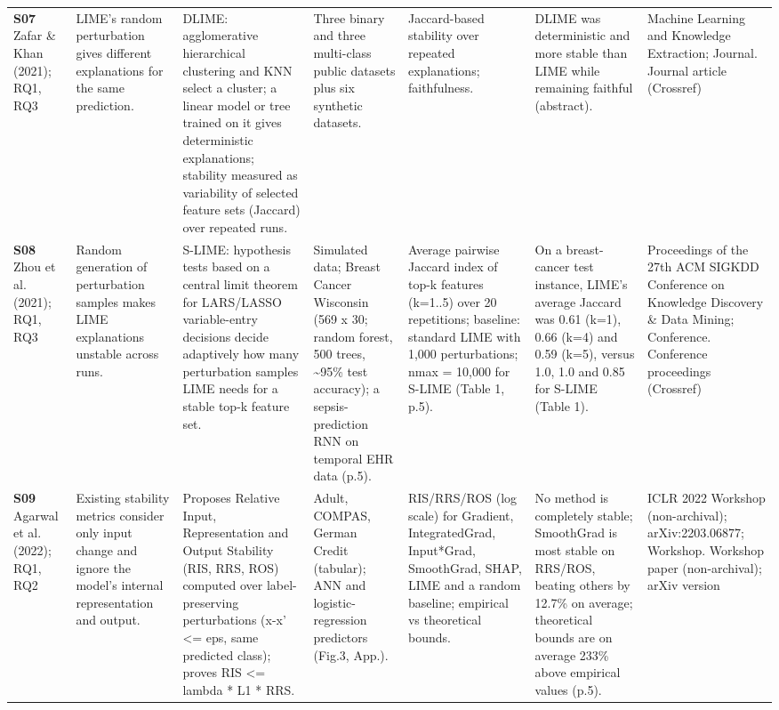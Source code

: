 \begin{longtable}{@{}P{1.55cm}P{2.9cm}P{4.5cm}P{3.2cm}P{3.4cm}P{4.6cm}P{3.6cm}@{}}
\textbf{S07} \cite{S07} Zafar \& Khan (2021); RQ1, RQ3 & LIME's random perturbation gives different explanations for the same prediction. & DLIME: agglomerative hierarchical clustering and KNN select a cluster; a linear model or tree trained on it gives deterministic explanations; stability measured as variability of selected feature sets (Jaccard) over repeated runs. & Three binary and three multi-class public datasets plus six synthetic datasets. & Jaccard-based stability over repeated explanations; faithfulness. & DLIME was deterministic and more stable than LIME while remaining faithful (abstract). & Machine Learning and Knowledge Extraction; Journal. Journal article (Crossref) \\
\textbf{S08} \cite{S08} Zhou et al. (2021); RQ1, RQ3 & Random generation of perturbation samples makes LIME explanations unstable across runs. & S-LIME: hypothesis tests based on a central limit theorem for LARS/\allowbreak{}LASSO variable-entry decisions decide adaptively how many perturbation samples LIME needs for a stable top-k feature set. & Simulated data; Breast Cancer Wisconsin (569 x 30; random forest, 500 trees, \textasciitilde{}95\% test accuracy); a sepsis-prediction RNN on temporal EHR data (p.5). & Average pairwise Jaccard index of top-k features (k=1..5) over 20 repetitions; baseline: standard LIME with 1,000 perturbations; nmax = 10,000 for S-LIME (Table 1, p.5). & On a breast-cancer test instance, LIME's average Jaccard was 0.61 (k=1), 0.66 (k=4) and 0.59 (k=5), versus 1.0, 1.0 and 0.85 for S-LIME (Table 1). & Proceedings of the 27th ACM SIGKDD Conference on Knowledge Discovery \& Data Mining; Conference. Conference proceedings (Crossref) \\
\textbf{S09} \cite{S09} Agarwal et al. (2022); RQ1, RQ2 & Existing stability metrics consider only input change and ignore the model's internal representation and output. & Proposes Relative Input, Representation and Output Stability (RIS, RRS, ROS) computed over label-preserving perturbations (\textbar{}\textbar{}x-x'\textbar{}\textbar{} \textless{}= eps, same predicted class); proves RIS \textless{}= lambda * L1 * RRS. & Adult, COMPAS, German Credit (tabular); ANN and logistic-regression predictors (Fig.3, App.). & RIS/\allowbreak{}RRS/\allowbreak{}ROS (log scale) for Gradient, IntegratedGrad, Input*Grad, SmoothGrad, SHAP, LIME and a random baseline; empirical vs theoretical bounds. & No method is completely stable; SmoothGrad is most stable on RRS/\allowbreak{}ROS, beating others by 12.7\% on average; theoretical bounds are on average 233\% above empirical values (p.5). & ICLR 2022 Workshop (non-archival); arXiv:2203.06877; Workshop. Workshop paper (non-archival); arXiv version \\

\end{longtable}
